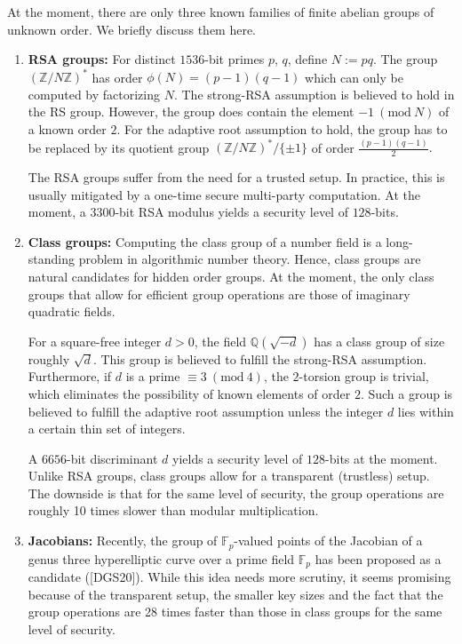 \documentclass[11pt, lettersize, notitlepage, leqno, footskip=0.6cm]{article}
\newcommand{\bz}{\mathbb Z}
\newcommand{\bq}{\mathbb Q}
\newcommand{\bFp}{\mathbb{F}_p}
\newcommand{\vs}{\vspace{-0.15cm}}
\newcommand{\Mod}[1]{\ (\mathrm{mod}\ #1)}
\numberwithin{equation}{section}
\begin{document}
At the moment, there are only three known families of finite abelian groups of unknown order. We briefly discuss them here.\vspace{0.2cm} \begin{enumerate}[wide, labelwidth=!, labelindent=0pt] \vs

\item \textbf{RSA groups:} For distinct $1536$-bit primes $p$, $q$, define $N:= pq$. The group $(\bz/N\bz)^*$ has order $\phi(N) = (p-1)(q-1)$ which can only be computed by factorizing $N$. The strong-RSA assumption is believed to hold in the RS group. However, the group does contain the element $-1\Mod{N}$ of a known order $2$. For the adaptive root assumption to hold, the group has to be replaced by its quotient group $(\bz/N\bz)^*/\{\pm 1\}$ of order $\frac{(p-1)(q-1)}{2}.$ 

The RSA groups suffer from the need for a trusted setup. In practice, this is usually mitigated by a one-time secure multi-party computation. At the moment, a $3300$-bit RSA modulus yields a security level of $128$-bits.


\item \textbf{Class groups:} Computing the class group of a number field is a long-standing problem in algorithmic number theory. Hence, class groups are natural candidates for hidden order groups. At the moment, the only class groups that allow for efficient group operations are those of imaginary quadratic fields.

For a square-free integer $d > 0$, the field $\bq(\sqrt{-d})$ has a class group of size roughly $\sqrt{d}$. This group is believed to fulfill the strong-RSA assumption. Furthermore, if $d$ is a prime $\equiv 3 \Mod{4}$, the $2$-torsion group is trivial, which eliminates the possibility of known elements of order $2$. Such a group is believed to fulfill the adaptive root assumption unless the integer $d$ lies within a certain thin set of integers.

A $6656$-bit discriminant $d$ yields a security level of $128$-bits at the moment. Unlike RSA groups, class groups allow for a transparent (trustless) setup. The downside is that for the same level of security, the group operations are roughly 10 times slower than modular multiplication.

\item \textbf{Jacobians:} Recently, the group of $\bFp$-valued points of the Jacobian of a genus three hyperelliptic curve over a prime field $\bFp$ has been proposed as a candidate ([DGS20]). While this idea needs more scrutiny, it seems promising because of the transparent setup, the smaller key sizes and the fact that the group operations are 28 times faster than those in class groups for the same level of security.


\end{enumerate}
\end{document}
